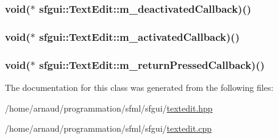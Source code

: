 \hypertarget{classsfgui_1_1TextEdit_bfa97d7c95f54cc91600375242fe1ea6}{
\subsubsection[m\_\-deactivatedCallback]{\setlength{\rightskip}{0pt plus 5cm}void($\ast$ {\bf sfgui::TextEdit::m\_\-deactivatedCallback})()}}
\label{classsfgui_1_1TextEdit_bfa97d7c95f54cc91600375242fe1ea6}


\hypertarget{classsfgui_1_1TextEdit_9cf910f9fca635f595d6a8963d7e30d1}{
\subsubsection[m\_\-activatedCallback]{\setlength{\rightskip}{0pt plus 5cm}void($\ast$ {\bf sfgui::TextEdit::m\_\-activatedCallback})()}}
\label{classsfgui_1_1TextEdit_9cf910f9fca635f595d6a8963d7e30d1}


\hypertarget{classsfgui_1_1TextEdit_d86f9eaadf1313214631b2de009abf55}{
\subsubsection[m\_\-returnPressedCallback]{\setlength{\rightskip}{0pt plus 5cm}void($\ast$ {\bf sfgui::TextEdit::m\_\-returnPressedCallback})()}}
\label{classsfgui_1_1TextEdit_d86f9eaadf1313214631b2de009abf55}




The documentation for this class was generated from the following files:\begin{CompactItemize}
\item 
/home/arnaud/programmation/sfml/sfgui/\hyperlink{textedit_8hpp}{textedit.hpp}\item 
/home/arnaud/programmation/sfml/sfgui/\hyperlink{textedit_8cpp}{textedit.cpp}\end{CompactItemize}
